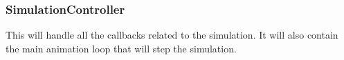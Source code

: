         \subsubsection{SimulationController}

            This will handle all the callbacks related to the simulation. It will also contain the main animation loop that will step the simulation.

